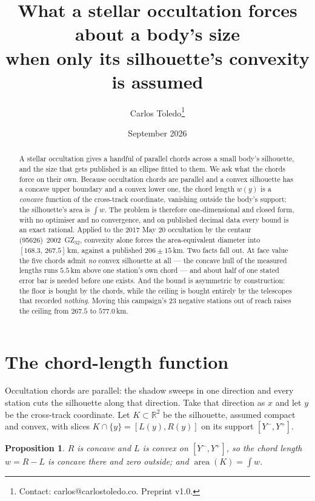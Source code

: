 \documentclass[11pt]{article}
\title{What a stellar occultation forces about a body's size\\
when only its silhouette's convexity is assumed}
\author{Carlos Toledo\thanks{Contact: carlos@carlostoledo.co.
Preprint v1.0. %
}}
\date{September 2026}
\newtheorem{proposition}{Proposition}
\newcommand{\R}{\mathbb{R}}
\begin{document}
\maketitle

\begin{abstract}
A stellar occultation gives a handful of parallel chords across a small body's
silhouette, and the size that gets published is an ellipse fitted to them. We
ask what the chords force on their own. Because occultation chords are parallel
and a convex silhouette has a concave upper boundary and a convex lower one, the
chord length $w(y)$ is a \emph{concave} function of the cross-track coordinate,
vanishing outside the body's support; the silhouette's area is $\int w$. The
problem is therefore one-dimensional and closed form, with no optimiser and no
convergence, and on published decimal data every bound is an exact rational.
Applied to the 2017 May 20 occultation by the centaur (95626)~2002~GZ$_{32}$,
convexity alone forces the area-equivalent diameter into
$[168.3,\,267.5]$\,km, against a published $206\pm15$\,km. Two facts fall out.
At face value the five chords admit \emph{no} convex silhouette at all --- the
concave hull of the measured lengths runs $5.5$\,km above one station's own
chord --- and about half of one stated error bar is needed before one exists.
And the bound is asymmetric by construction: the floor is bought by the chords,
while the ceiling is bought entirely by the telescopes that recorded
\emph{nothing}. Moving this campaign's 23 negative stations out of reach raises
the ceiling from $267.5$ to $577.0$\,km.
\end{abstract}

\section{The chord-length function}

Occultation chords are parallel: the shadow sweeps in one direction and every
station cuts the silhouette along that direction. Take that direction as $x$ and
let $y$ be the cross-track coordinate. Let $K\subset\R^2$ be the silhouette,
assumed compact and convex, with slices
$K\cap\{y\}=[L(y),R(y)]$ on its support $[Y^-,Y^+]$.

\begin{proposition}\label{prop:concave}
$R$ is concave and $L$ is convex on $[Y^-,Y^+]$, so the chord length
$w=R-L$ is concave there and zero outside; and $\operatorname{area}(K)=\int w$.
\end{proposition}
\end{document}
